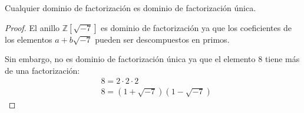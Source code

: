 \begin{ce}
    Cualquier dominio de factorización es dominio de factorización única.
\end{ce}

\begin{proof}
    El anillo $\mathbb{Z}[\sqrt{-7}]$ es dominio de factorización ya que los coeficientes de los elementos $a + b\sqrt{-7}$ pueden ser descompuestos en primos.

    Sin embargo, no es dominio de factorización única ya que el elemento $8$ tiene más de una factorización:
    \begin{equation}
        \begin{split}
            & 8 = 2 \cdot 2 \cdot 2\\
            & 8 = (1 + \sqrt{-7})(1 - \sqrt{-7})
        \end{split} 
    \end{equation}
\end{proof}
